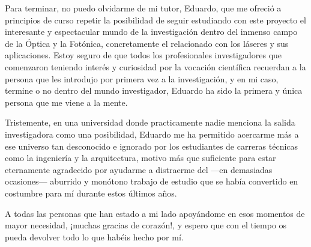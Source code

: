Para terminar, no puedo olvidarme de mi tutor, Eduardo, que me ofreció a principios de curso repetir la posibilidad de seguir estudiando con este proyecto el interesante y espectacular mundo de la investigación dentro del inmenso campo de la Óptica y la Fotónica, concretamente el relacionado con los láseres y sus aplicaciones. Estoy seguro de que todos los profesionales investigadores que comenzaron teniendo interés y curiosidad por la vocación científica recuerdan a la persona que les introdujo por primera vez a la investigación, y en mi caso, termine o no dentro del mundo investigador, Eduardo ha sido la primera y única persona que me viene a la mente. 

Tristemente, en una universidad donde practicamente nadie menciona la salida investigadora como una posibilidad, Eduardo me ha permitido acercarme más a ese universo tan desconocido e ignorado por los estudiantes de carreras técnicas como la ingeniería y la arquitectura, motivo más que suficiente para estar eternamente agradecido por ayudarme a distraerme del ---en demasiadas ocasiones--- aburrido y monótono trabajo de estudio que se había convertido en costumbre para mí durante estos últimos años.

A todas las personas que han estado a mi lado apoyándome en esos momentos de mayor necesidad, ¡muchas gracias de corazón!, y espero que con el tiempo os pueda devolver todo lo que habéis hecho por mí.



